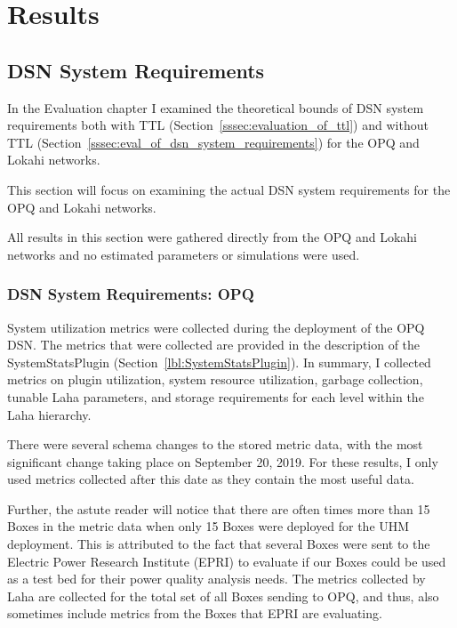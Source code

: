 \chapter{Results}\label{ch:results}

\section{DSN System Requirements}\label{sec:dsn-system-requirements}

In the Evaluation chapter I examined the theoretical bounds of DSN system requirements both with TTL (Section~\ref{sssec:evaluation_of_ttl}) and without TTL (Section~\ref{sssec:eval_of_dsn_system_requirements}) for the OPQ and Lokahi networks.

This section will focus on examining the actual DSN system requirements for the OPQ and Lokahi networks.

All results in this section were gathered directly from the OPQ and Lokahi networks and no estimated parameters or simulations were used.

\subsection{DSN System Requirements: OPQ}\label{subsec:dsn-system-requirements:-opq}

System utilization metrics were collected during the deployment of the OPQ DSN. The metrics that were collected are provided in the description of the SystemStatsPlugin (Section~\ref{lbl:SystemStatsPlugin}). In summary, I collected metrics on plugin utilization, system resource utilization, garbage collection, tunable Laha parameters, and storage requirements for each level within the Laha hierarchy.

There were several schema changes to the stored metric data, with the most significant change taking place on September 20, 2019. For these results, I only used metrics collected after this date as they contain the most useful data.

Further, the astute reader will notice that there are often times more than 15 Boxes in the metric data when only 15 Boxes were deployed for the UHM deployment. This is attributed to the fact that several Boxes were sent to the Electric Power Research Institute (EPRI) to evaluate if our Boxes could be used as a test bed for their power quality analysis needs. The metrics collected by Laha are collected for the total set of all Boxes sending to OPQ, and thus, also sometimes include metrics from the Boxes that EPRI are evaluating.

